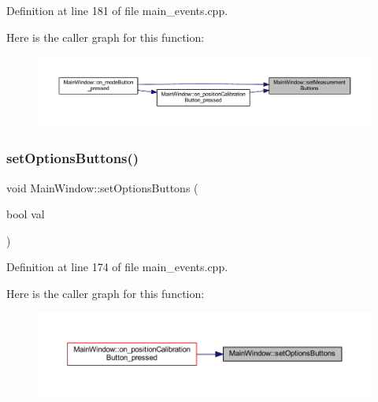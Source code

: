Definition at line 181 of file main\+\_\+events.\+cpp.

Here is the caller graph for this function\+:
\nopagebreak
\begin{figure}[H]
\begin{center}
\leavevmode
\includegraphics[width=350pt]{classMainWindow_aa6af159870a097c8347efae3a7c26e6f_icgraph}
\end{center}
\end{figure}
\mbox{\label{classMainWindow_a47326e5f671c05053baaa75a2a4059e7}} 
\subsubsection{\texorpdfstring{setOptionsButtons()}{setOptionsButtons()}}
{\footnotesize\ttfamily void Main\+Window\+::set\+Options\+Buttons (\begin{DoxyParamCaption}\item[{bool}]{val }\end{DoxyParamCaption})\hspace{0.3cm}{\ttfamily [private]}}



Definition at line 174 of file main\+\_\+events.\+cpp.

Here is the caller graph for this function\+:
\nopagebreak
\begin{figure}[H]
\begin{center}
\leavevmode
\includegraphics[width=350pt]{classMainWindow_a47326e5f671c05053baaa75a2a4059e7_icgraph}
\end{center}
\end{figure}
\mbox{\label{classMainWindow_a64190d66464e087f1df9ba7541ae52ff}} 
